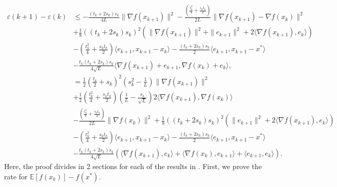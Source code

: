 \documentclass{article}
\theoremstyle{plain}
\theoremstyle{definition}
\theoremstyle{remark}
\begin{document}
        \begin{align}\label{Lyap_stc_6}
            \varepsilon(k+1)-\varepsilon(k)&\leq -\frac{(t_k+2s_k)s_k}{4L} \|\nabla f(x_{k+1})\|^2-\frac{(\frac{t_{k}^2}{4}+\frac{s_{k}t_{k}}{2})}{2L}\|\nabla f(x_{k+1})-\nabla f(x_k)\|^2\nonumber\\
            &+\frac{1}{8}((t_k+2s_k)s_k)^2(\|\nabla f(x_{k+1})\|^2+\|e_{k+1}\|^2+2\langle \nabla f(x_{k+1}) ,e_k \rangle) \nonumber\\
            & -(\frac{t_k^2}{4}+\frac{s_kt_k}{2})\langle e_{k+1},x_{k+1}-x_k\rangle-\frac{(t_k+2s_k)s_k}{2}\langle e_{k+1},x_{k+1}-x^*\rangle\nonumber\\
         & -\frac{t_k(t_k+2s_k)s_k}{4\sqrt{L}}\langle \nabla f(x_{k+1})+e_{k+1}, \nabla f(x_k)+e_k \rangle,\nonumber\\
         &=\frac{1}{2}\left(\frac{t_k}{2}+s_k\right)^2(s_k^2-\frac{1}{L})\|\nabla f(x_{k+1})\|^2\nonumber\\
         &+\frac{1}{2}\left(\frac{t_k^2}{4}+\frac{s_kt_k}{2} \right)(\frac{1}{L}-\frac{s_k}{\sqrt{L}}) 2\langle \nabla f(x_{k+1}),\nabla f(x_k) \rangle\nonumber\\
         &-\frac{(\frac{t_{k}^2}{4}+\frac{s_{k}t_{k}}{2})}{2L}\|\nabla f(x_k)\|^2+\frac{1}{8}((t_k+2s_k)s_k)^2(\|e_{k+1}\|^2+2\langle \nabla f(x_{k+1}) ,e_k \rangle)\nonumber\\
         & -(\frac{t_k^2}{4}+\frac{s_kt_k}{2})\langle e_{k+1},x_{k+1}-x_k\rangle-\frac{(t_k+2s_k)s_k}{2}\langle e_{k+1},x_{k+1}-x^*\rangle\nonumber\\
         &-\frac{t_k(t_k+2s_k)s_k}{4\sqrt{L}}\left(\langle \nabla f(x_{k+1}),e_k \rangle+\langle \nabla f(x_{k}) , e_{k+1}\rangle+\langle e_{k+1},e_k\rangle\right).
        \end{align}
        Here, the proof divides in 2 sections for each of the results in . First, we prove the rate for $\mathbb E\left[f(x_k)\right]-f(x^*)$. 
        
\end{document}
